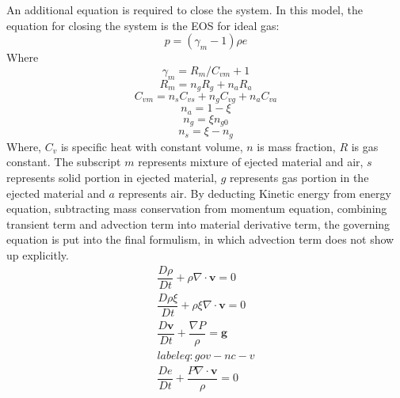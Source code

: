 \documentclass[10pt,a4paper]{article}
\begin{document}
An additional equation is required to close the system. In this model, the equation for closing the system is the EOS for ideal gas:
\begin{equation}
p = (\gamma_m - 1)\rho e \label{eq:EOS}
\end{equation}
Where 
\begin{equation}
\gamma_m = R_m/C_{vm} + 1 \label{eq:gov-gm}
\end{equation}
\begin{equation}
R_m = n_gR_g + n_aR_a  \label{eq:gov-Rm}
\end{equation}
\begin{equation}
C_{vm} = n_s C_{vs} + n_g C_{vg} + n_a C_{va} \label{eq:gov-Cvm}
\end{equation}
\begin{equation}
n_a = 1 - \xi \label{eq:gov-na}
\end{equation}
\begin{equation}
n_g = \xi n_{g0} \label{eq:gov-ng}
\end{equation}
\begin{equation}
n_s = \xi - n_g \label{eq:gov-ns}
\end{equation}
Where, $C_v$ is specific heat with constant volume, $n$ is mass fraction, $R$ is gas constant. The subscript 
$m$ represents mixture of ejected material and air, $s$ represents solid portion in ejected material, $g$ represents gas portion in the ejected material and $a$ represents air.
By deducting Kinetic energy from energy equation, subtracting mass conservation from momentum equation, combining transient term and advection term into material derivative term, the governing equation is put into the final formulism, in which advection term does not show up explicitly. 
\begin{eqnarray}
\dfrac{D \rho}{D t} + \rho \nabla \cdot \textbf{v} = 0 \label{eq:gov-nc-rho}\\
\dfrac{D \rho \xi}{D t} + \rho \xi \nabla \cdot \textbf{v} = 0 \label{eq:gov-nc-ks}\\
\dfrac{D \textbf{v}}{D t} + \dfrac{\nabla P}{\rho} =\textbf{g} \\label{eq:gov-nc-v}\\
\dfrac{D e}{D t} + \dfrac{P \nabla \cdot \textbf{v}}{\rho} = 0 \label{eq:gov-nc-e}
\end{eqnarray}
\end{document}
